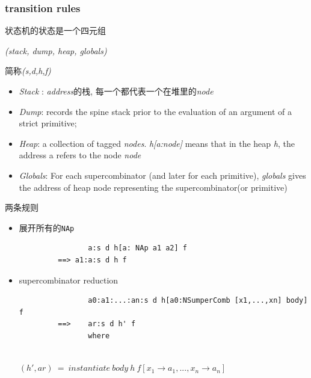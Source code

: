 \documentclass [11pt, a4paper]{article}
\begin{document}
\begin{flushleft}
\begin{CJK*}{UTF8}{song}
    \subsubsection{transition rules}
    状态机的状态是一个四元组
    \begin{center}
        \emph{(stack, dump, heap, globals)}
    \end{center}
    简称\emph{(s,d,h,f)}
    \begin{itemize}
        \item \emph{Stack} : \emph{address}的栈, 每一个都代表一个在堆里的\emph{node} 
        \item \emph{Dump}: records the spine stack prior to the evaluation of an argument of a strict primitive;
        \item \emph{Heap}: a collection of tagged \emph{nodes}. \emph{h[a:node]} means that in the heap \emph{h}, the address a refers to the node \emph{node}
        \item \emph{Globals}: For each supercombinator (and later for each primitive), \emph{globals} gives the address of heap node representing the supercombinator(or primitive)
    \end{itemize}
    两条规则
    \begin{itemize}
        \item 展开所有的\texttt{NAp}
         \begin{verbatim}
                a:s d h[a: NAp a1 a2] f
         ==> a1:a:s d h f
        \end{verbatim}
        \item supercombinator reduction
        \begin{verbatim}
                a0:a1:...:an:s d h[a0:NSumperComb [x1,...,xn] body] f 
         ==>    ar:s d h' f
                where
                
        \end{verbatim}
        $(h', ar)\ =\ instantiate\ body\ h\ f [x_1\rightarrow a_1,...,x_n\rightarrow a_n]$
    \end{itemize}

    
\end{CJK*}
    
    \end{flushleft}
\end{document}
